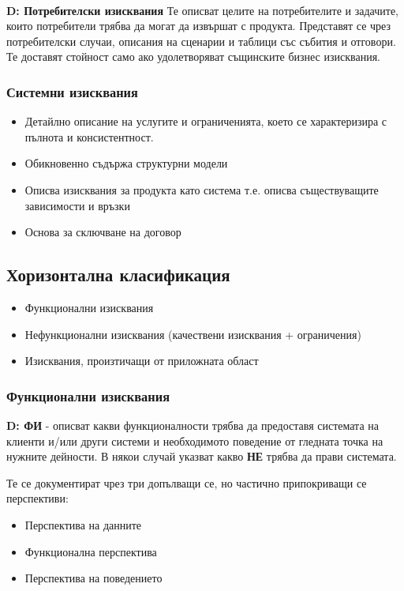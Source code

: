 \documentclass[fleqn,12pt]{article}
\begin{document}
\paragraph{}
\textbf{D: Потребителски изисквания} Те описват целите на потребителите и задачите, които потребители трябва да могат да извършат с продукта. Представят  се чрез потребителски случаи, описания на сценарии и таблици със събития и отговори. Те доставят стойност само ако удолетворяват същинските бизнес изисквания.

\subsubsection{Системни изисквания}
\begin{itemize}
	\item Детайлно описание на услугите и ограниченията, което се характеризира с пълнота и консистентност.
	\item Обикновенно съдържа структурни модели
	\item Описва изисквания за продукта като система т.е. описва съществуващите зависимости и връзки
	\item Основа за сключване на договор
\end{itemize}

\subsection{Хоризонтална класификация}

\begin{itemize}
	\item Функционални изисквания
	\item Нефункционални изисквания (качествени изисквания + ограничения)
	\item Изисквания, произтичащи от приложната област
\end{itemize}


\subsubsection{Функционални изисквания}
\textbf{D: ФИ} - описват какви функционалности трябва да предоставя системата на клиенти и/или други системи и необходимото поведение от гледната точка на нужните дейности. В някои случай указват какво \textbf{НЕ} трябва да прави системата.

Те се документират чрез три допълващи се, но частично припокриващи се перспективи:
\begin{itemize}
	\item Перспектива на данните
	\item Функционална перспектива
	\item Перспектива на поведението
\end{itemize}
\end{document}
